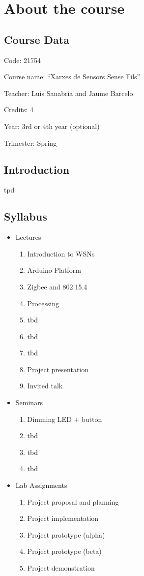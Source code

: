 \chapter{About the course}

\section{Course Data}

Code: 21754

Course name: ``Xarxes de Sensors Sense Fils''

Teacher: Luis Sanabria and Jaume Barcelo

Credits: 4

Year: 3rd or 4th year (optional)

Trimester: Spring

\section{Introduction}
tpd

\section{Syllabus}
\begin{itemize}
  \item Lectures
  \begin{enumerate}
    \item Introduction to WSNs
    \item Arduino Platform
    \item Zigbee and 802.15.4
    \item Processing
    \item tbd
    \item tbd
    \item tbd
    \item Project presentation
    \item Invited talk
  \end{enumerate}
  \item Seminars
  \begin{enumerate}
    \item Dimming LED + button
    \item tbd
    \item tbd
    \item tbd
  \end{enumerate}
\item Lab Assignments
  \begin{enumerate}
    \item Project proposal and planning
    \item Project implementation
    \item Project prototype (alpha)
    \item Project prototype (beta)
    \item Project demonstration
  \end{enumerate}
\end{itemize}

